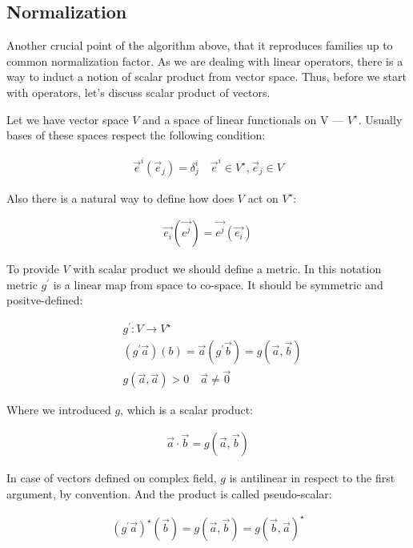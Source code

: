\subsection{Normalization}
Another crucial point of the algorithm above, that it reproduces families
up to common normalization factor. As we are dealing with linear operators,
there is a way to induct a notion of scalar product from vector space. Thus,
before we start with operators, let's discuss scalar product of vectors.

Let we have vector space $V$ and a space of linear functionals on V --- $V^\star$.
Usually bases of these spaces respect the following condition:

\begin{align}
    \vec{e}^i(\vec{e}_j) = \delta^i_j \quad \vec{e}^i \in V^\star, \vec{e}_j \in V
\end{align}

Also there is a natural way to define how does $V$ act on $V^\star$:

\begin{align}
    \vec{e_i}(\vec{e^j}) = \vec{e^j}(\vec{e_i})
\end{align}

To provide $V$ with scalar product we should define a metric. In this notation
metric $g^\prime$ is a linear map from space to co-space. It should be symmetric
and positve-defined:

\begin{align}
        &g^\prime: V \rightarrow V^\star \\
        &(g^\prime\vec{a})(b) = \vec{a}(g^\prime\vec{b}) = g(\vec{a}, \vec{b}) \\
        & g(\vec{a}, \vec{a}) > 0 \quad \vec{a} \neq \vec{0}
\end{align}

Where we introduced $g$, which is a scalar product:

\begin{align}
    \vec{a}\cdot\vec{b} = g(\vec{a}, \vec{b})
\end{align}

In case of vectors defined on complex field, $g$ is antilinear in respect to the
first argument, by convention. And the product is called pseudo-scalar:

\begin{align}
    (g^\prime\vec{a})^\star(\vec{b}) = g(\vec{a}, \vec{b}) = g(\vec{b}, \vec{a})^\star
\end{align}

